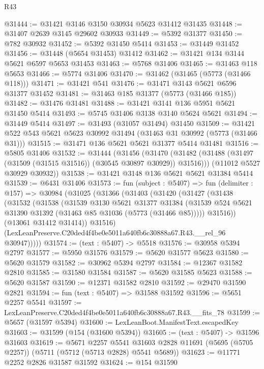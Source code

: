 \begin{lexlean}{R43}
\begin{coremodule}
@31444 := @31421 @3146 @3150 @30934 @5623 @31412 @31435
@31448 := @31407 @2639 @3145 @29602 @30933
@31449 := @5392 @31377
@31450 := @782 @30932
@31452 := @5392 @31450 @5414
@31453 := @31449 @31452
@31456 := @31448 (@5654 @31453) @31412
@31462 := @31421 @134 @3144 @5621 @6597 @5653 @31453
@31463 := @5768 @31406
@31465 := @31463 @118 @5653
@31466 := @5774 @31406
@31470 := @31462 (@31465 (@5773 (@31466 @118)))
@31471 := @31421 @541
@31476 := @31471 @3143 @5621 @6596 @31377 @31452
@31481 := @31463 @185 @31377 (@5773 (@31466 @185))
@31482 := @31476 @31481
@31488 := @31421 @3141 @136 @5951 @5621 @31450 @5414
@31493 := @5745 @31406 @3138 @3140 @5624 @5621
@31494 := @31449 @5414
@31497 := @31493 (@31057 @31494) @31450
@31509 := @31421 @522 @543 @5621 @5623 @30992 @31494 (@31463 @31 @30992 (@5773 (@31466 @31)))
@31515 := @31471 @136 @5621 @5621 @31377 @5414 @31481
@31516 := @5805 @31406
@31532 := @31444
    (@31456
      (@31470 (@31482 (@31488 (@31497 (@31509 (@31515 @31516)) (@30545 @30897 @30929)) @31516)))
      (@11012 @5527 @30929 @30932))
@31538 := @31421 @3148 @136 @5621 @5621 @31384 @5414
@31539 := @6431 @31406
@31573 := fun (subject : @5407) =>
  fun (delimiter : @157) =>
  @30984
    (@31025
      (@31366
        (@31403
          (@31420
            (@31427
              (@31438
                (@31532
                  (@31538
                    (@31539
                      @3130
                      @5621
                      @31377
                      @31384
                      (@31539 @524 @5621 @31390 @31392 (@31463 @85 @31036 (@5773 (@31466 @85)))))
                    @31516))
                (@13061 @31412 @31414))
              @31516)
            (LexLeanPreserve.C20ded4f4be0e5011a640fb6c30888a67.R43.__rel_96 @30947)))))
@31574 := (text : @5407) -> @5518
@31576 := @30958 @5394 @2797
@31577 := @5950 @31576
@31579 := @5620 @31577 @5623
@31580 := @5620 @31579
@31582 := @30962 @5394 @2797
@31584 := @12367 @31582 @2810
@31585 := @31580 @31584
@31587 := @5620 @31585 @5623
@31588 := @5620 @31587
@31590 := @12371 @31582 @2810
@31592 := @29470 @31590 @2821
@31594 := fun (text : @5407) => @31588 @31592
@31596 := @5651 @2257 @5541
@31597 := LexLeanPreserve.C20ded4f4be0e5011a640fb6c30888a67.R43.__fits_78
@31599 := @5657 (@31597 @5394)
@31600 := LexLeanBoot.ManifestText.escapedKey
@31603 := @31599 (@154 (@31600 @5394))
@31605 := (text : @5407) -> @31596 @31603
@31619 := @5671
    @2257
    @5541
    @31603
    @2828
    @11691
    (@5695 (@5705 @2257))
    (@5711 (@5712 (@5713 @2828) @5541 @5689))
@31623 := @11771 @2252 @2826 @31587 @31592
@31624 := @154 @31590

\end{coremodule}
\end{lexlean}
